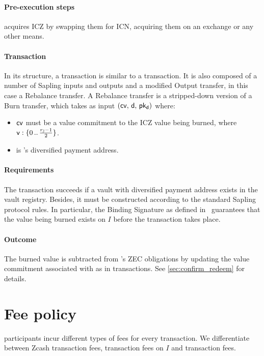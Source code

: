 \paragraph{Pre-execution steps}
\vault acquires ICZ by swapping them for ICN, acquiring them on an exchange or any other means.

\paragraph{Transaction}
In its structure, a \rebalance transaction is similar to a \burn transaction.
It is also composed of a number of Sapling inputs and outputs and a modified Output transfer, in this case a Rebalance transfer.
A Rebalance transfer is a stripped-down version of a Burn transfer, which takes as input $(\mathsf{cv},\, \mathsf{d},\, \mathsf{pk_d})$ where:
\begin{itemize}
    \item $\mathsf{cv}$ must be a value commitment to the ICZ value \val being burned, where $\mathsf{v} : \{0\,..\,\frac{r_\mathbb{J}-1}{2}\}$.
    
    \item \dpa is \vault's diversified payment address.
\end{itemize}

\paragraph{Requirements}
The \rebalance transaction succeeds if a vault with diversified payment address \dpa exists in the vault registry.
Besides, it must be constructed according to the standard Sapling protocol rules.
In particular, the Binding Signature as defined in~\cite[Section 4.12]{hopwood2016zcash} guarantees that the value being burned exists on $I$ before the transaction takes place.

\paragraph{Outcome}
The burned value is subtracted from \vault's ZEC obligations by updating the value commitment \cb associated with \vault as in \confirmRedeem transactions.
See \cref{sec:confirm_redeem} for details.


\section{Fee policy}
\label{sec:fees}

\zclaim participants incur different types of fees for every transaction.
We differentiate between Zcash transaction fees, transaction fees on $I$ and \zclaim transaction fees.

